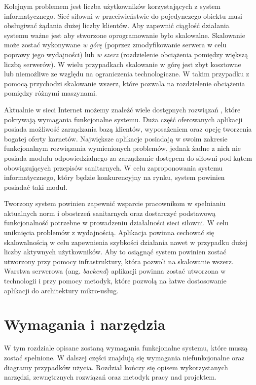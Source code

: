 \documentclass[a4paper,twoside,12pt]{book}
\newcommand{\obcy}[1]{\emph{#1}}
\newcommand{\ang}[1]{{\selectlanguage{british}\obcy{#1}}}
\begin{document}
Kolejnym problemem jest liczba użytkowników korzystających z system informatycznego. Sieć siłowni w przeciwieństwie do pojedynczego obiektu musi obsługiwać żądania dużej liczby klientów. Aby zapewnić ciągłość działania systemu ważne jest aby stworzone oprogramowanie było skalowalne. Skalowanie może zostać wykonywane \textit{w górę} (poprzez zmodyfikowanie serwera w celu poprawy jego wydajności) lub \textit{w szerz} (rozdzielenie obciążenia pomiędzy większą liczbą serwerów)\cite{bib:mongodb_guide}. W wielu przypadkach skalowanie w górę jest zbyt kosztowne lub niemożliwe ze względu na ograniczenia technologiczne. W takim przypadku z pomocą przychodzi skalowanie wszerz, które pozwala na rozdzielenie obciążenia pomiędzy różnymi maszynami.

Aktualnie w sieci Internet możemy znaleźć wiele dostępnych rozwiązań \cite{bib:perfectgym} \cite{bib:wodguru}, które pokrywają wymagania funkcjonalne systemu. Duża część oferowanych aplikacji posiada możliwość zarządzania bazą klientów, wyposażeniem oraz opcję tworzenia bogatej oferty karnetów. Największe aplikacje posiadają w swoim zakresie funkcjonalnym rozwiązania wymienionych problemów, jednak żadne z nich nie posiada modułu odpowiedzialnego za zarządzanie dostępem do siłowni pod kątem obowiązujących przepisów sanitarnych. W celu zaproponowania systemu informatycznego, który będzie konkurencyjny na rynku, system powinien posiadać taki moduł.

Tworzony system powinien zapewnić wsparcie pracownikom w spełnianiu aktualnych norm i obostrzeń sanitarnych oraz dostarczyć podstawową funkcjonalność potrzebne w prowadzeniu działalności sieci siłowni. W celu uniknięcia problemów z wydajnością. Aplikacja powinna cechować się skalowalnością w celu zapewnienia szybkości działania nawet w przypadku dużej liczby aktywnych użytkowników. Aby to osiągnąć system powinien zostać utworzony przy pomocy infrastruktury, która pozwoli na skalowanie wszerz. Warstwa serwerowa (ang. \ang{backend}) aplikacji powinna zostać utworzona w technologii i przy pomocy metodyk, które pozwolą na łatwe dostosowanie aplikacji do architektury mikro-usług.

\chapter{Wymagania i narzędzia}
W tym rozdziale opisane zostaną wymagania funkcjonalne systemu, które muszą zostać spełnione. W dalszej części znajdują się wymagania niefunkcjonalne oraz diagramy przypadków użycia. Rozdział kończy się opisem wykorzystanych narzędzi, zewnętrznych rozwiązań oraz metodyk pracy nad projektem.
\end{document}
